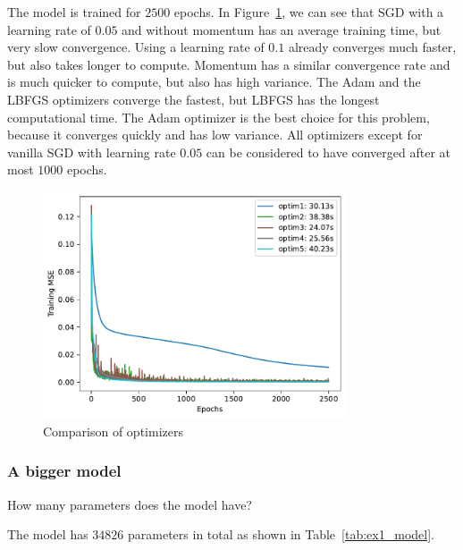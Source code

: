 \documentclass{article}
\newenvironment{task}[1]{
  \begin{tcolorbox}[
    colback=highlight!5!white,
    colframe=highlight,
    title={Task #1}
  ]
}{
  \end{tcolorbox}
}
\begin{document}
The model is trained for $2500$ epochs. In Figure~\ref{fig:ex1_optimizers}, we can see that SGD with
a learning rate of $0.05$ and without momentum has an average training time, but very slow
convergence. Using a learning rate of $0.1$ already converges much faster, but also takes longer to
compute. Momentum has a similar convergence rate and is much quicker to compute, but also has high
variance. The Adam and the LBFGS optimizers converge the fastest, but LBFGS has the longest
computational time. The Adam optimizer is the best choice for this problem, because it converges
quickly and has low variance. All optimizers except for vanilla SGD with learning rate $0.05$ can
be considered to have converged after at most $1000$ epochs.
\begin{figure}[ht!]
  \centering
  \includegraphics[width=0.8\textwidth]{ex1_optimizers.pdf}
  \caption{Comparison of optimizers}
  \label{fig:ex1_optimizers}
\end{figure}


\subsubsection*{A bigger model}
\begin{task}{1.3.5}
  How many parameters does the model have?
\end{task}

The model has $34826$ parameters in total as shown in Table~\ref{tab:ex1_model}.
\end{document}

